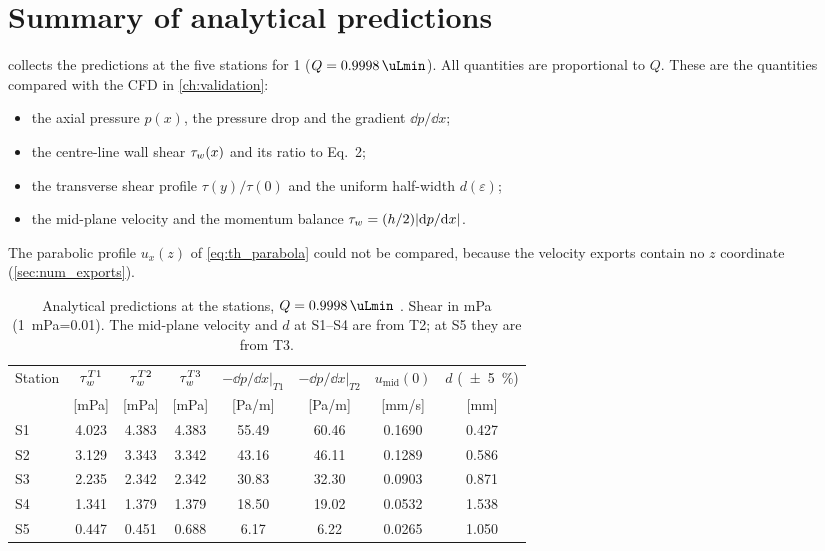 \section{Summary of analytical predictions}

 collects the predictions at the five stations for \SI{1}{\uLmin} ($Q=\SI{0.9998}{\uLmin}$). All quantities are proportional to $Q$. These are the quantities compared with the CFD in \cref{ch:validation}:
\begin{itemize}
\item the axial pressure $p(x)$, the pressure drop and the gradient $\dd p/\dd x$;
\item the centre-line wall shear $\tau_{w}(x)$ and its ratio to Eq.~2;
\item the transverse shear profile $\tau(y)/\tau(0)$ and the uniform half-width $d(\varepsilon)$;
\item the mid-plane velocity and the momentum balance $\tau_{w}=(h/2)|\mathrm{d} p/\mathrm{d} x|$.
\end{itemize}
The parabolic profile $u_x(z)$ of \cref{eq:th_parabola} could not be compared, because the velocity exports contain no $z$ coordinate (\cref{sec:num_exports}).

\begin{table}[htbp]
\centering
\caption{Analytical predictions at the stations, $Q=\SI{0.9998}{\uLmin}$ \tagT. Shear in mPa (\SI{1}{mPa}=\SI{0.01}{\dyncm}). The mid-plane velocity and $d$ at S1--S4 are from T2; at S5 they are from T3.}
\label{tab:theory_stations}
\small
\begin{tabular}{@{}lccccccc@{}}
\toprule
Station & $\tau_{w}^{T1}$ & $\tau_{w}^{T2}$ & $\tau_{w}^{T3}$ & $-\dd p/\dd x|_{T1}$ & $-\dd p/\dd x|_{T2}$ & $u_{\mathrm{mid}}(0)$ & $d$ (\SI{\pm5}{\percent})\\
 & [mPa] & [mPa] & [mPa] & [Pa/m] & [Pa/m] & [mm/s] & [mm]\\
\midrule
S1 & 4.023 & 4.383 & 4.383 & 55.49 & 60.46 & 0.1690 & 0.427\\
S2 & 3.129 & 3.343 & 3.342 & 43.16 & 46.11 & 0.1289 & 0.586\\
S3 & 2.235 & 2.342 & 2.342 & 30.83 & 32.30 & 0.0903 & 0.871\\
S4 & 1.341 & 1.379 & 1.379 & 18.50 & 19.02 & 0.0532 & 1.538\\
S5 & 0.447 & 0.451 & 0.688 & 6.17 & 6.22 & 0.0265 & 1.050\\
\bottomrule
\end{tabular}
\end{table}
